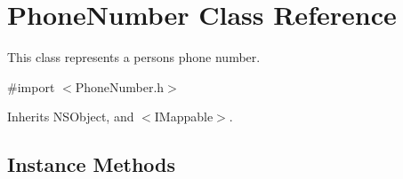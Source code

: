\hypertarget{interface_phone_number}{}\section{Phone\+Number Class Reference}
\label{interface_phone_number}


This class represents a person\textquotesingle{}s phone number.  




{\ttfamily \#import $<$Phone\+Number.\+h$>$}



Inherits N\+S\+Object, and $<$\+I\+Mappable$>$.

\subsection*{Instance Methods}
